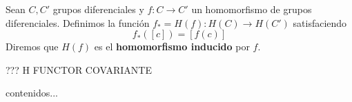 \begin{definicion}
	Sean $C, C'$ grupos diferenciales y $f:C \rightarrow C'$ un homomorfismo de grupos diferenciales. Definimos la función $f_* = H(f): H(C) \rightarrow H(C')$ satisfaciendo 
	\[f_*([c]) = [f(c)] \]
	Diremos que $H(f)$ es el \textbf{homomorfismo inducido} por $f$.
\end{definicion}

??? H FUNCTOR COVARIANTE

\begin{ejemplo}
	contenidos...
\end{ejemplo}

\endinput
